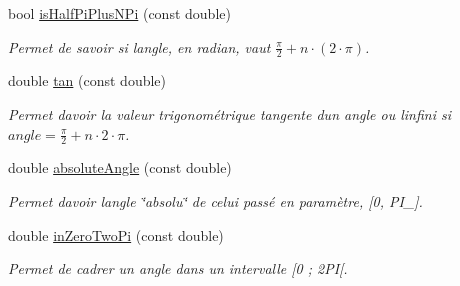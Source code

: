 \begin{DoxyCompactItemize}
bool \hyperlink{namespaceutilities_a41bdf53d6ca758ab77ab736b41ae272f}{is\+Half\+Pi\+Plus\+N\+Pi} (const double)
\begin{DoxyCompactList}\small\item\em Permet de savoir si l\textquotesingle{}angle, en radian, vaut $ \frac{\pi}{2} + n \cdot (2 \cdot \pi)$. \end{DoxyCompactList}\item 
double \hyperlink{namespaceutilities_a376cfb5f6c163526c76d1df2bcfe98d9}{tan} (const double)
\begin{DoxyCompactList}\small\item\em Permet d\textquotesingle{}avoir la valeur trigonométrique tangente d\textquotesingle{}un angle ou l\textquotesingle{}infini si $ angle = \frac{\pi}{2} + n \cdot 2 \cdot \pi $. \end{DoxyCompactList}\item 
double \hyperlink{namespaceutilities_abaa7273912e8e804c0558a64b7470bb7}{absolute\+Angle} (const double)
\begin{DoxyCompactList}\small\item\em Permet d\textquotesingle{}avoir l\textquotesingle{}angle \char`\"{}absolu\char`\"{} de celui passé en paramètre, \mbox{[}0, P\+I\+\_\mbox{]}. \end{DoxyCompactList}\item 
double \hyperlink{namespaceutilities_a7ab0a2bd18a3227e0d59c6445fe2e9de}{in\+Zero\+Two\+Pi} (const double)
\begin{DoxyCompactList}\small\item\em Permet de cadrer un angle dans un intervalle \mbox{[}0 ; 2\+P\+I\mbox{[}. \end{DoxyCompactList}\end{DoxyCompactItemize}

